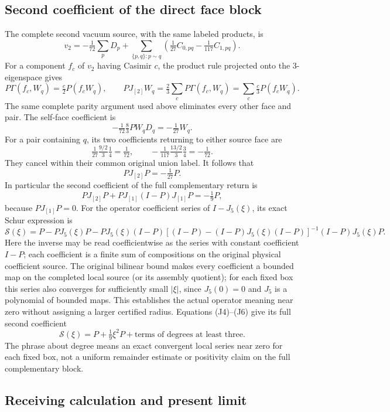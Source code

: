 \documentclass[11pt]{article}
\begin{document}
\subsection*{Second coefficient of the direct face block}

The complete second vacuum source, with the same labeled products, is
\[
 v_2=-\tfrac1{72}\sum_pD_p+
 \sum_{\{p,q\}:p\sim q}
       \left(\tfrac1{27}C_{0,pq}-\tfrac1{117}C_{1,pq}\right).
\]
For a component \(f_c\) of \(v_2\) having Casimir \(c\), the product rule projected onto the 3-eigenspace gives
\[
 P\Gamma(f_c,W_q)=\tfrac c2P(f_cW_q),\qquad
 PJ_{[2]}W_q=\tfrac23\sum_cP\Gamma(f_c,W_q)
            =\sum_c\tfrac c3P(f_cW_q).
\]
The same complete parity argument used above eliminates every other face and pair. The self-face coefficient is
\[
 -\tfrac1{72}\tfrac83PW_qD_q=-\tfrac1{27}W_q.
\]
For a pair containing \(q\), its two coefficients returning to either source face are
\[
 \tfrac1{27}\tfrac{9/2}{3}\tfrac14=\tfrac1{72},\qquad
 -\tfrac1{117}\tfrac{13/2}{3}\tfrac34=-\tfrac1{72}.
\]
They cancel within their common original union label. It follows that
\[
 \boxed{PJ_{[2]}P=-\tfrac1{27}P.}\tag{J5}
\]
In particular the second coefficient of the full complementary return is
\[
 PJ_{[2]}P+PJ_{[1]}(I-P)J_{[1]}P=-\tfrac19P, \tag{J6}
\]
because \(PJ_{[1]}P=0\). For the operator coefficient series of \(I-J_5(\xi)\), its exact Schur expression is
\[
 \mathscr S(\xi)=P-PJ_5(\xi)P
 -PJ_5(\xi)(I-P)
 \left[(I-P)-(I-P)J_5(\xi)(I-P)\right]^{-1}
 (I-P)J_5(\xi)P.
\]
Here the inverse may be read coefficientwise as the series with constant coefficient \(I-P\); each coefficient is a finite sum of compositions on the original physical coefficient source. The original bilinear bound makes every coefficient a bounded map on the completed local source (or its assembly quotient); for each fixed box this series also converges for sufficiently small \(|\xi|\), since \(J_5(0)=0\) and \(J_5\) is a polynomial of bounded maps. This establishes the actual operator meaning near zero without assigning a larger certified radius. Equations (J4)–(J6) give its full second coefficient
\[
 \boxed{\mathscr S(\xi)=P+\tfrac19\xi^2P+
       \text{terms of degrees at least three}.}\tag{J7}
\]
The phrase about degree means an exact convergent local series near zero for each fixed box, not a uniform remainder estimate or positivity claim on the full complementary block.

\subsection*{Receiving calculation and present limit}
\end{document}
